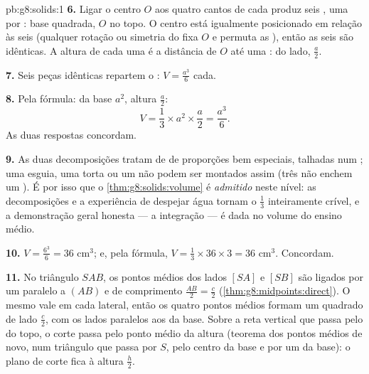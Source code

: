 \begin{solution}{pb:g8:solids:1}
\textbf{6.} Ligar o centro $O$ aos quatro cantos de cada  produz
seis , uma por : base quadrada,  $O$ no topo. O
centro está igualmente posicionado em relação às seis  (qualquer
rotação ou simetria do  fixa $O$ e permuta as ), então as seis
 são idênticas. A altura de cada uma é a distância de $O$ até
uma :  do lado, $\frac{a}{2}$.

\textbf{7.} Seis peças idênticas repartem o : $V = \frac{a^3}{6}$
cada.

\textbf{8.} Pela fórmula:  da base $a^2$, altura $\frac a2$:
\[
V = \frac13 \times a^2 \times \frac{a}{2} = \frac{a^3}{6} .
\]
As duas respostas concordam.

\textbf{9.} As duas decomposições tratam de  de proporções
bem especiais, talhadas num ; uma  esguia, uma 
torta ou um  não podem ser montados assim (três  não enchem um
). É por isso que o \cref{thm:g8:solids:volume} é
\emph{admitido} neste nível: as decomposições e a experiência de
despejar água tornam o $\frac13$ inteiramente crível, e a demonstração
geral honesta --- a integração --- é dada no volume do ensino médio.

\textbf{10.} $V = \frac{6^3}{6} = 36$ cm$^3$; e, pela fórmula,
$V = \frac13 \times 36 \times 3 = 36$ cm$^3$. Concordam.

\textbf{11.} No triângulo $SAB$, os pontos médios dos lados $[SA]$ e
$[SB]$ são ligados por um  paralelo a $(AB)$ e de comprimento
$\frac{AB}{2} = \frac{c}{2}$ (\cref{thm:g8:midpoints:direct}). O mesmo
vale em cada  lateral, então os quatro pontos médios formam um
quadrado de lado $\frac c2$, com os lados paralelos aos da base. Sobre
a reta vertical que passa pelo  do topo, o corte passa pelo
ponto médio da altura (teorema dos pontos médios de novo, num
triângulo que passa por $S$, pelo centro da base e por um  da
base): o plano de corte fica à altura $\frac h2$.


\end{solution}
